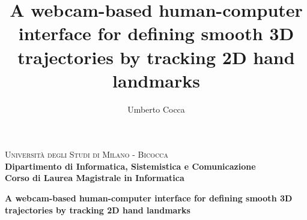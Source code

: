 \documentclass[mscthesis, 11pt, oneside, openany]{usiinfthesis}
\title{A webcam-based human-computer interface for defining smooth 3D trajectories by tracking 2D hand landmarks}
\author{Umberto Cocca} %
\begin{document}
\thispagestyle{empty}
\begin{titlepage}
	
	\noindent
	\begin{minipage}[t]{0.23\textwidth}
	\end{minipage}
	\begin{minipage}[t]{0.82\textwidth}
		{
			{\textsc{Università degli Studi di Milano - Bicocca}} \\
			\textbf{Dipartimento di Informatica, Sistemistica e Comunicazione} \\
			\textbf{Corso di Laurea Magistrale in Informatica} \\
			\par
		}
	\end{minipage}
	
	\vspace{35mm}
	
	\begin{center}
		{\LARGE{
				\textbf{A webcam-based human-computer interface for defining smooth 3D trajectories by tracking 2D hand landmarks}
				\par
		}}
	\end{center}
	

\end{titlepage}
\end{document}
